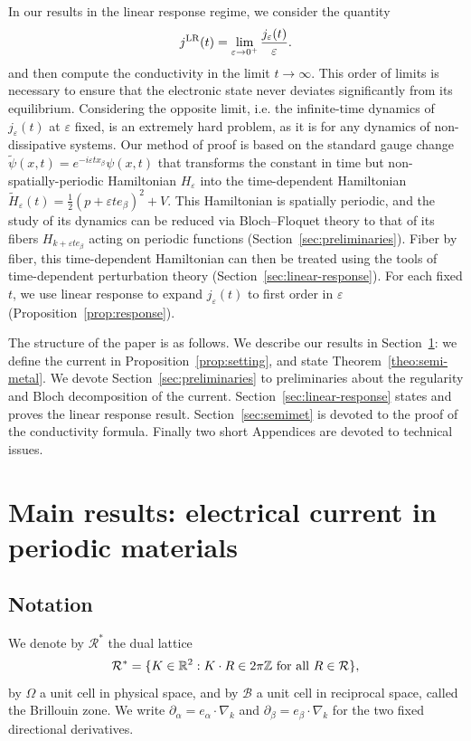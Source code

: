 \documentclass[a4paper,11pt]{article}
\theoremstyle{plain}
\theoremstyle{remark}
\def\R{{\mathbb R}}
\def\Z{{\mathbb Z}}
\def\eps{{\varepsilon}}
\def\cB{{\mathcal B}}
\def\cR{{\mathcal R}}
\begin{document}
In our results in the linear response regime, we consider the quantity
\begin{align*}
  j^{\rm LR}(t) = \lim_{\eps \to 0^+} \frac {j_\eps(t)}{\eps}.
\end{align*}
and then compute the conductivity in the limit $t \to \infty$. This
order of limits is necessary to ensure that the electronic state never
deviates significantly from its equilibrium. Considering the opposite
limit, i.e. the infinite-time dynamics of
$j_\eps(t)$ at $\eps$ fixed, is an extremely
hard problem, as it is for any dynamics of non-dissipative systems.
Our method of proof is based on the standard gauge change
$\widetilde\psi(x,t)=e^{-i\eps t x_\beta}\psi(x,t)$
that transforms the constant in time but non-spatially-periodic
Hamiltonian $H_\eps$ into the time-dependent Hamiltonian
$\widetilde H_\eps(t)=\frac12(p+\eps t e_\beta)^2+V$.
This Hamiltonian is spatially periodic, and the study of its dynamics
can be reduced via Bloch--Floquet theory to that of its fibers
$H_{k+\eps t e_\beta}$ acting on periodic functions
(Section~\ref{sec:preliminaries}). Fiber by fiber, this time-dependent
Hamiltonian can then be treated using the tools of time-dependent
perturbation theory (Section~\ref{sec:linear-response}). For each fixed $t$,
we use linear response to expand $j_\eps(t)$ to first order in $\eps$
(Proposition~\ref{prop:response}).


The structure of the paper is as follows. We describe our results in
Section~\ref{sec:results}: we define the current in
Proposition~\ref{prop:setting}, and state Theorem~\ref{theo:semi-metal}.
We devote Section~\ref{sec:preliminaries} to preliminaries about the
regularity and Bloch decomposition of the current.
Section~\ref{sec:linear-response} states and proves the linear response result.
Section~\ref{sec:semimet} is devoted to the proof of the conductivity
formula. Finally two short Appendices are devoted to technical issues.

\section{Main results: electrical current in periodic materials}\label{sec:results}


\subsection{Notation}
\label{sec:notation}
We denote by $\cR^*$ the dual lattice
\[
\cR^*=\{K\in\R^2:K\cdot R\in2\pi\Z\hbox{ for all }R\in\cR\},
\]
by $\Omega$ a unit cell in physical space, and by $\cB$ a unit cell in
reciprocal space, called the Brillouin zone. We write
$\partial_\alpha=e_\alpha\cdot\nabla_k$ and
$\partial_\beta=e_\beta\cdot\nabla_k$ for the two fixed directional derivatives.
\end{document}
